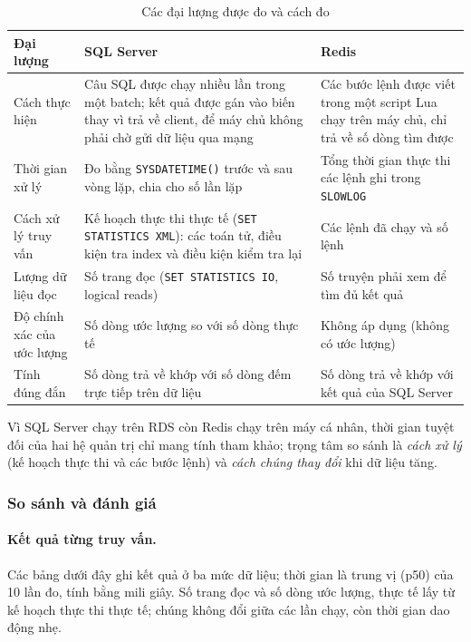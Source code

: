 \begin{table}[H]
    \centering
    \caption{Các đại lượng được đo và cách đo}
    \label{tab:qp-measure}
    \begin{tabularx}{\textwidth}{>{\raggedright\arraybackslash}p{3.2cm} X X}
        \toprule
        \textbf{Đại lượng} & \textbf{SQL Server} & \textbf{Redis} \\
        \midrule
        Cách thực hiện & Câu SQL được chạy nhiều lần trong một batch; kết quả được gán vào biến thay vì trả về client, để máy chủ không phải chờ gửi dữ liệu qua mạng & Các bước lệnh được viết trong một script Lua chạy trên máy chủ, chỉ trả về số dòng tìm được \\
        \addlinespace
        Thời gian xử lý & Đo bằng \texttt{SYSDATETIME()} trước và sau vòng lặp, chia cho số lần lặp & Tổng thời gian thực thi các lệnh ghi trong \texttt{SLOWLOG} \\
        \addlinespace
        Cách xử lý truy vấn & Kế hoạch thực thi thực tế (\texttt{SET STATISTICS XML}): các toán tử, điều kiện tra index và điều kiện kiểm tra lại & Các lệnh đã chạy và số lệnh \\
        \addlinespace
        Lượng dữ liệu đọc & Số trang đọc (\texttt{SET STATISTICS IO}, logical reads) & Số truyện phải xem để tìm đủ kết quả \\
        \addlinespace
        Độ chính xác của ước lượng & Số dòng ước lượng so với số dòng thực tế & Không áp dụng (không có ước lượng) \\
        \addlinespace
        Tính đúng đắn & Số dòng trả về khớp với số dòng đếm trực tiếp trên dữ liệu & Số dòng trả về khớp với kết quả của SQL Server \\
        \bottomrule
    \end{tabularx}
\end{table}

Vì SQL Server chạy trên RDS còn Redis chạy trên máy cá nhân, thời gian tuyệt đối của hai hệ quản trị chỉ mang tính tham khảo; trọng tâm so sánh là \textit{cách xử lý} (kế hoạch thực thi và các bước lệnh) và \textit{cách chúng thay đổi} khi dữ liệu tăng.

\subsubsection{So sánh và đánh giá}

\paragraph{Kết quả từng truy vấn.}
Các bảng dưới đây ghi kết quả ở ba mức dữ liệu; thời gian là trung vị (p50) của 10 lần đo, tính bằng mili giây. Số trang đọc và số dòng ước lượng, thực tế lấy từ kế hoạch thực thi thực tế; chúng không đổi giữa các lần chạy, còn thời gian dao động nhẹ.

